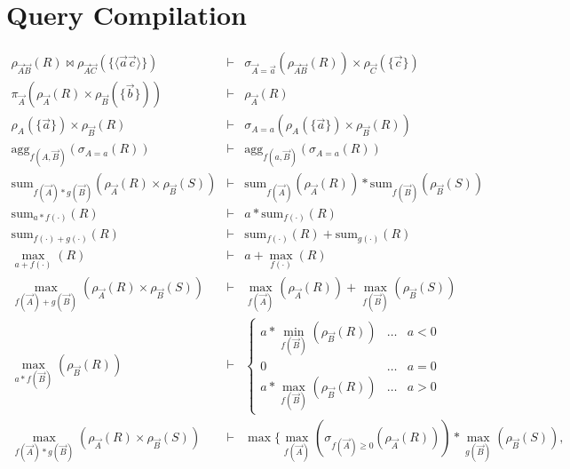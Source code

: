 \documentclass[10pt,twocolumn]{article}
\newcommand{\tuple}[1]{{\langle#1\rangle}}
\begin{document}
\section{Query Compilation}


\def\algsum{\mathrm{sum}}
\def\algagg{\mathrm{agg}}


\begin{figure*}
\begin{eqnarray}
\rho_{\vec{A}\vec{B}}(R) \bowtie \rho_{\vec{A}\vec{C}}(\{ \tuple{\vec{a}\vec{c}} \})
&\vdash&
\sigma_{\vec{A}=\vec{a}}(\rho_{\vec{A}\vec{B}}(R)) \times \rho_{\vec{C}}(\{ \vec{c} \})
\label{r1}
\\
\pi_{\vec{A}}(\rho_{\vec{A}}(R) \times \rho_{\vec{B}}(\{ \vec{b} \}))
&\vdash&
\rho_{\vec{A}}(R)
\label{r2}
\\
\rho_{A}(\{\vec{a}\}) \times \rho_{\vec{B}}(R)
&\vdash&
\sigma_{A=a}(\rho_{A}(\{\vec{a}\}) \times \rho_{\vec{B}}(R))
\label{r3}
\\
\algagg_{f(A,\vec{B})}(\sigma_{A=a}(R))
&\vdash&
\algagg_{f(a,\vec{B})}(\sigma_{A=a}(R))
\label{r4}
\\
\algsum_{f(\vec{A}) * g(\vec{B})}(\rho_{\vec{A}}(R) \times \rho_{\vec{B}}(S))
&\vdash&
\algsum_{f(\vec{A})}(\rho_{\vec{A}}(R)) *
\algsum_{f(\vec{B})}(\rho_{\vec{B}}(S))
\label{r5}
\\
\algsum_{a * f(\cdot)}(R)
&\vdash&
a * \algsum_{f(\cdot)}(R)
\label{r6}
\\
\algsum_{f(\cdot) + g(\cdot)}(R)
&\vdash&
\algsum_{f(\cdot)}(R) + \algsum_{g(\cdot)}(R)
\label{r7}
\\
\max_{a + f(\cdot)}(R)
&\vdash&
a + \max_{f(\cdot)}(R)
\label{r8}
\\
\max_{f(\vec{A}) + g(\vec{B})}(\rho_{\vec{A}}(R) \times \rho_{\vec{B}}(S))
&\vdash&
\max_{f(\vec{A})}(\rho_{\vec{A}}(R)) +
\max_{f(\vec{B})}(\rho_{\vec{B}}(S))
\label{r9}
\\
\max_{a * f(\vec{B})}(\rho_{\vec{B}}(R))
&\vdash&
\left\{
\begin{array}{lll}
a * \min_{f(\vec{B})}(\rho_{\vec{B}}(R)) & \dots & a < 0 \\
0                                        & \dots & a = 0 \\
a * \max_{f(\vec{B})}(\rho_{\vec{B}}(R)) & \dots & a > 0
\end{array}
\right.
\label{r10}
\\
\max_{f(\vec{A}) * g(\vec{B})}(\rho_{\vec{A}}(R) \times \rho_{\vec{B}}(S))
&\vdash&
\max\Big\{
\max_{f(\vec{A})}(\sigma_{f(\vec{A}) \ge 0}(\rho_{\vec{A}}(R))) *
\max_{g(\vec{B})}(\rho_{\vec{B}}(S)),

\end{eqnarray}
\end{figure*}
\end{document}
